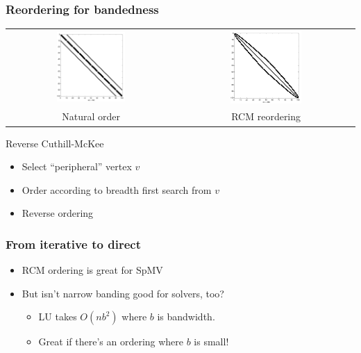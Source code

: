 \documentclass{beamer}
\begin{document}
\begin{frame}
  \frametitle{Reordering for bandedness}

  \begin{tabular}{cc}
  \includegraphics[width=0.42\textwidth]{figs/laplace2d-spy.pdf} &
  \includegraphics[width=0.42\textwidth]{figs/laplace2d-spy-rcm.pdf} \\
  Natural order & RCM reordering
  \end{tabular}
  
  \vspace{1mm}
  Reverse Cuthill-McKee
  \begin{itemize}
  \item Select ``peripheral'' vertex $v$
  \item Order according to breadth first search from $v$
  \item Reverse ordering
  \end{itemize}
\end{frame}

\begin{frame}
  \frametitle{From iterative to direct}
  
  \begin{itemize}
  \item RCM ordering is great for SpMV
  \item But isn't narrow banding good for solvers, too?
    \begin{itemize}
    \item LU takes $O(nb^2)$ where $b$ is bandwidth.
    \item Great if there's an ordering where $b$ is small!
    \end{itemize}
  \end{itemize}
\end{frame}
\end{document}
